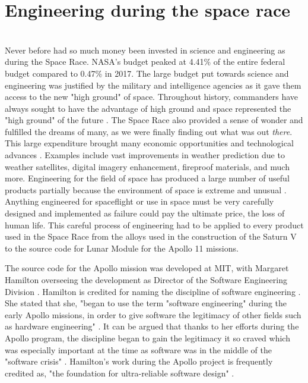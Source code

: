 \documentclass[10pt, journal]{IEEEtran}
\begin{document}
\section{Engineering during the space race}
~\\
 Never before had so much money been invested in science and engineering as during the Space Race. NASA's budget peaked at 4.41\% of the entire federal budget compared to 0.47\% in 2017. The large budget put towards science and engineering was justified by the military and intelligence agencies as it gave them access to the new "high ground" of space. Throughout history, commanders have always sought to have the advantage of high ground and space represented the "high ground" of the future \cite{highground}. The Space Race also provided a sense of wonder and fulfilled the dreams of many, as we were finally finding out what was out \textit{there}. This large expenditure brought many economic opportunities and technological advances \cite{highground}. Examples include vast improvements in weather prediction due to weather satellites, digital imagery enhancement, fireproof materials, and much more. Engineering for the field of space has produced a large number of useful products partially because the environment of space is extreme and unusual \cite{highground}. Anything engineered for spaceflight or use in space must be very carefully designed and implemented as failure could pay the ultimate price, the loss of human life. This careful process of engineering had to be applied to every product used in the Space Race from the alloys used in the construction of the Saturn V to the source code \cite{11code} for Lunar Module for the Apollo 11 missions.

The source code for the Apollo mission was developed at MIT, with Margaret Hamilton overseeing the development as Director of the Software Engineering Division \cite{hamiltonNASA}. Hamilton is credited for naming the discipline of software engineering \cite{hamiltonFellow}. She stated that she, "began to use the term "software engineering" during the early Apollo missions, in order to give software the legitimacy of other fields such as hardware engineering" \cite{hamiltonMoon}. It can be argued that thanks to her efforts during the Apollo program, the discipline began to gain the legitimacy it so craved which was especially important at the time as software was in the middle of the "software crisis" \cite{softwareCrisis}. Hamilton's work during the Apollo project is frequently credited as, "the foundation for ultra-reliable software design" \cite{hamiltonHonour}.
\end{document}
